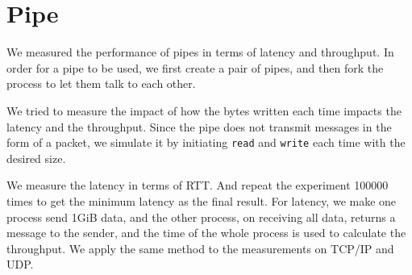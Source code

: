 \section{Pipe}

We measured the performance of pipes in terms of latency and throughput. In order for a pipe to be used, we first create a pair of pipes, and then fork the process to let them talk to each other.

We tried to measure the impact of how the bytes written each time impacts the latency and the throughput. Since the pipe does not transmit messages in the form of a packet, we simulate it by initiating \texttt{read} and \texttt{write} each time with the desired size.

We measure the latency in terms of RTT. And repeat the experiment 100000 times to get the minimum latency as the final result. For latency, we make one process send 1GiB data, and the other process, on receiving all data, returns a message to the sender, and the time of the whole process is used to calculate the throughput. We apply the same method to the measurements on TCP/IP and UDP.